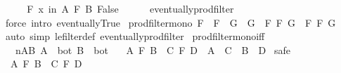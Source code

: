 \begin{isabellebody}
\ \ \isamarkupfalse%
\ \isamarkupfalse%
\ {\isachardoublequoteopen}{\isasymforall}\isactrlsub F\ x\ in\ A\ {\isasymtimes}\isactrlsub F\ B{\isachardot}{\kern0pt}\ False{\isachardoublequoteclose}\isanewline
\ \ \ \ \isamarkupfalse%
\ eventually{\isacharunderscore}{\kern0pt}prod{\isacharunderscore}{\kern0pt}filter\ \isamarkupfalse%
\ {\isacharparenleft}{\kern0pt}force\ intro{\isacharcolon}{\kern0pt}\ eventually{\isacharunderscore}{\kern0pt}True{\isacharparenright}{\kern0pt}\isanewline
{}\isamarkupfalse%
%
\endisatagproof
{\isafoldproof}%
%
\isadelimproof
\isanewline
%
\endisadelimproof
\isanewline
{}\isamarkupfalse%
\ prod{\isacharunderscore}{\kern0pt}filter{\isacharunderscore}{\kern0pt}mono{\isacharcolon}{\kern0pt}\ {\isachardoublequoteopen}F\ {\isasymle}\ F{\isacharprime}{\kern0pt}\ {\isasymLongrightarrow}\ G\ {\isasymle}\ G{\isacharprime}{\kern0pt}\ {\isasymLongrightarrow}\ F\ {\isasymtimes}\isactrlsub F\ G\ {\isasymle}\ F{\isacharprime}{\kern0pt}\ {\isasymtimes}\isactrlsub F\ G{\isacharprime}{\kern0pt}{\isachardoublequoteclose}\isanewline
%
\isadelimproof
\ \ %
\endisadelimproof
%
\isatagproof
{}\isamarkupfalse%
\ {\isacharparenleft}{\kern0pt}auto\ simp{\isacharcolon}{\kern0pt}\ le{\isacharunderscore}{\kern0pt}filter{\isacharunderscore}{\kern0pt}def\ eventually{\isacharunderscore}{\kern0pt}prod{\isacharunderscore}{\kern0pt}filter{\isacharparenright}{\kern0pt}%
\endisatagproof
{\isafoldproof}%
%
\isadelimproof
\isanewline
%
\endisadelimproof
\isanewline
{}\isamarkupfalse%
\ prod{\isacharunderscore}{\kern0pt}filter{\isacharunderscore}{\kern0pt}mono{\isacharunderscore}{\kern0pt}iff{\isacharcolon}{\kern0pt}\isanewline
\ \ \ nAB{\isacharcolon}{\kern0pt}\ {\isachardoublequoteopen}A\ {\isasymnoteq}\ bot{\isachardoublequoteclose}\ {\isachardoublequoteopen}B\ {\isasymnoteq}\ bot{\isachardoublequoteclose}\isanewline
\ \ \ {\isachardoublequoteopen}A\ {\isasymtimes}\isactrlsub F\ B\ {\isasymle}\ C\ {\isasymtimes}\isactrlsub F\ D\ {\isasymlongleftrightarrow}\ A\ {\isasymle}\ C\ {\isasymand}\ B\ {\isasymle}\ D{\isachardoublequoteclose}\isanewline
%
\isadelimproof
%
\endisadelimproof
%
\isatagproof
{}\isamarkupfalse%
\ safe\isanewline
\ \ \isamarkupfalse%
\ {\isacharasterisk}{\kern0pt}{\isacharcolon}{\kern0pt}\ {\isachardoublequoteopen}A\ {\isasymtimes}\isactrlsub F\ B\ {\isasymle}\ C\ {\isasymtimes}\isactrlsub F\ D{\isachardoublequoteclose}\isanewline
\ \ \isamarkupfalse%

\end{isabellebody}
